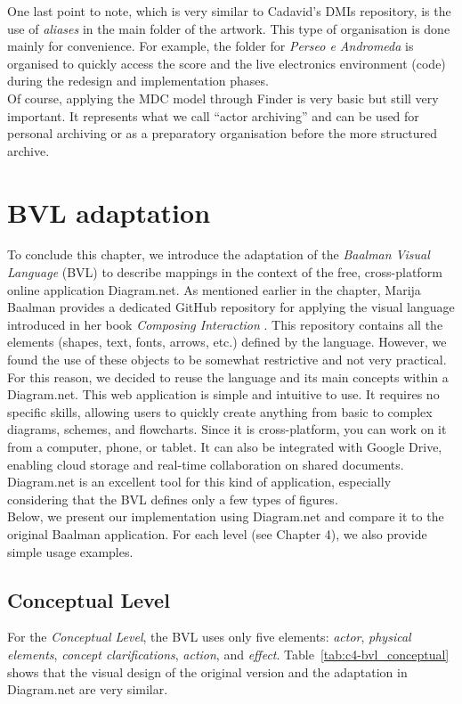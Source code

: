 One last point to note, which is very similar to Cadavid’s DMIs repository, is the use of \textit{aliases} in the main folder of the artwork. This type of organisation is done mainly for convenience. For example, the folder for \textit{Perseo e Andromeda} is organised to quickly access the score and the live electronics environment (code) during the redesign and implementation phases.\\
Of course, applying the MDC model through Finder is very basic but still very important. It represents what we call ``actor archiving'' and can be used for personal archiving or as a preparatory organisation before the more structured archive.  

\section{BVL adaptation}
To conclude this chapter, we introduce the adaptation of the \textit{Baalman Visual Language} (BVL) to describe mappings in the context of the free, cross-platform online application Diagram.net. As mentioned earlier in the chapter, Marija Baalman provides a dedicated GitHub repository for applying the visual language introduced in her book \textit{Composing Interaction} \cite{baalman2022composing}. This repository contains all the elements (shapes, text, fonts, arrows, etc.) defined by the language. However, we found the use of these objects to be somewhat restrictive and not very practical. For this reason, we decided to reuse the language and its main concepts within a Diagram.net. This web application is simple and intuitive to use. It requires no specific skills, allowing users to quickly create anything from basic to complex diagrams, schemes, and flowcharts. Since it is cross-platform, you can work on it from a computer, phone, or tablet. It can also be integrated with Google Drive, enabling cloud storage and real-time collaboration on shared documents. Diagram.net is an excellent tool for this kind of application, especially considering that the BVL defines only a few types of figures.\\
Below, we present our implementation using Diagram.net and compare it to the original Baalman application. For each level (see Chapter 4), we also provide simple usage examples.

\subsection{Conceptual Level}
For the \textit{Conceptual Level}, the BVL uses only five elements: \textit{actor}, \textit{physical elements}, \textit{concept clarifications}, \textit{action}, and \textit{effect}. Table~\ref{tab:c4-bvl_conceptual} shows that the visual design of the original version and the adaptation in Diagram.net are very similar.

